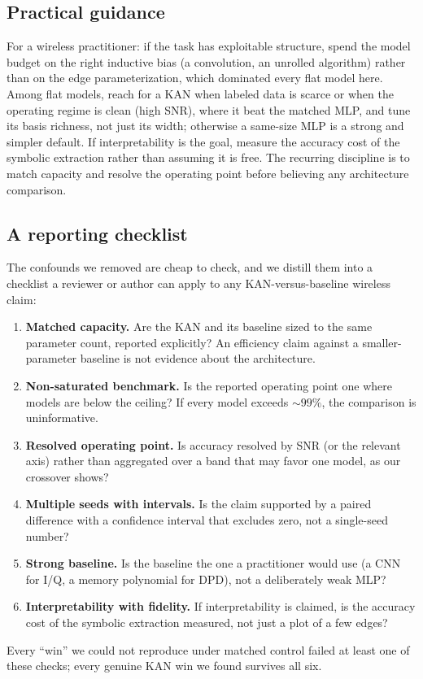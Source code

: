 \documentclass[final,5p,times]{elsarticle}
\begin{document}
\subsection{Practical guidance}
For a wireless practitioner: if the task has exploitable structure, spend the model budget on
the right inductive bias (a convolution, an unrolled algorithm) rather than on the edge
parameterization, which dominated every flat model here. Among flat models, reach for a KAN
when labeled data is scarce or when the operating regime is clean (high SNR), where it beat
the matched MLP, and tune its basis richness, not just its width; otherwise a same-size MLP
is a strong and simpler default. If interpretability is the goal, measure the accuracy cost of
the symbolic extraction rather than assuming it is free. The recurring discipline is to match
capacity and resolve the operating point before believing any architecture comparison.

\subsection{A reporting checklist}
The confounds we removed are cheap to check, and we distill them into a checklist a reviewer
or author can apply to any KAN-versus-baseline wireless claim:
\begin{enumerate}
\item \textbf{Matched capacity.} Are the KAN and its baseline sized to the same parameter
count, reported explicitly? An efficiency claim against a smaller-parameter baseline is not
evidence about the architecture.
\item \textbf{Non-saturated benchmark.} Is the reported operating point one where models are
below the ceiling? If every model exceeds $\sim\!99\%$, the comparison is uninformative.
\item \textbf{Resolved operating point.} Is accuracy resolved by SNR (or the relevant axis)
rather than aggregated over a band that may favor one model, as our crossover shows?
\item \textbf{Multiple seeds with intervals.} Is the claim supported by a paired difference
with a confidence interval that excludes zero, not a single-seed number?
\item \textbf{Strong baseline.} Is the baseline the one a practitioner would use (a CNN for
I/Q, a memory polynomial for DPD), not a deliberately weak MLP?
\item \textbf{Interpretability with fidelity.} If interpretability is claimed, is the accuracy
cost of the symbolic extraction measured, not just a plot of a few edges?
\end{enumerate}
Every ``win'' we could not reproduce under matched control failed at least one of these
checks; every genuine KAN win we found survives all six.
\end{document}
